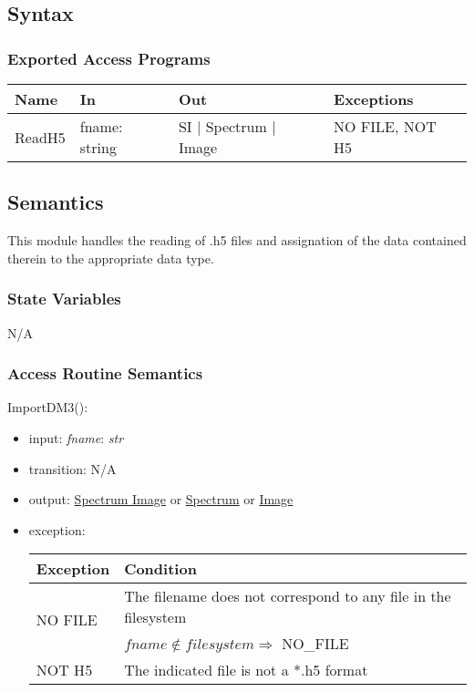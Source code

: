 \documentclass[12pt, titlepage]{article}
\begin{document}
\subsection{Syntax}

\subsubsection{Exported Access Programs}

\begin{center}
    \begin{tabular}{p{2cm} p{4cm} p{4cm} p{2cm}}
        \hline
        \textbf{Name} & \textbf{In} & \textbf{Out} & \textbf{Exceptions} \\
        \hline
        ReadH5 & fname: string & SI $|$ Spectrum $|$ Image & NO FILE, NOT H5 \\
        \hline
    \end{tabular}
\end{center}

\subsection{Semantics}
This module handles the reading of .h5 files and assignation of the data
contained therein to the appropriate data type.

\subsubsection{State Variables}
N/A

\subsubsection{Access Routine Semantics}

\noindent ImportDM3():
\begin{itemize}
    \item input: \textit{fname}: \textit{str}
    \item transition: N/A
    \item output: \hyperref[Mod:SI]{Spectrum Image} or
    \hyperref[Mod:Spectrum]{Spectrum} or \hyperref[Mod:Image]{Image}
    \item exception: 
    \begin{center}
        \begin{tabular}{p{3cm} p{12cm}}
            \toprule[0.15em]
            \textbf{Exception} & \textbf{Condition}\\
            \midrule[0.1em]
            \multirow{2}{0.25\textwidth}{NO FILE} & The filename does not
            correspond to any file in the filesystem\\ 
            & $fname \notin filesystem \Rightarrow$ NO\_FILE\\ 
            \midrule[0.05em]
            NOT H5 & The indicated file is not a *.h5 format\\
            \bottomrule[0.15em]
        \end{tabular}
    \end{center}
\end{itemize}
\end{document}
